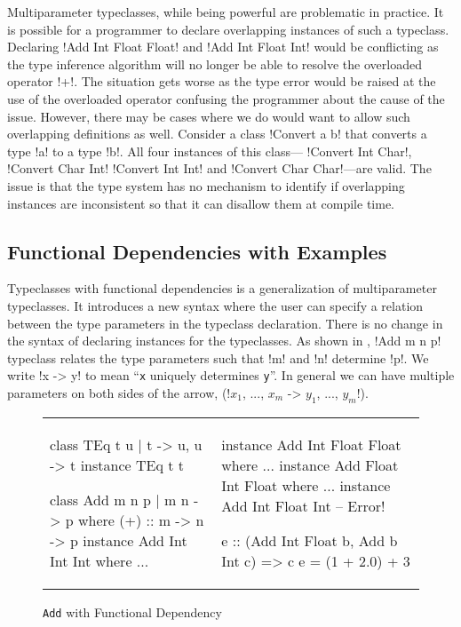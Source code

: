 \documentclass[format=acmsmall,manuscript,review,screen,nonacm,margin=1in,11pt]{acmart}
\begin{document}
Multiparameter typeclasses, while being powerful are problematic in practice.
It is possible for a programmer to declare overlapping instances of such a typeclass.
Declaring !Add Int Float Float! and !Add Int Float Int!
would be conflicting as the type inference algorithm will no longer be able to resolve
the overloaded operator !+!. The situation gets worse as the type error would be raised
at the use of the overloaded operator confusing the programmer about the
cause of the issue. However, there may be cases where we do would want to allow such overlapping definitions as well.
Consider a class !Convert a b! that converts a type !a! to a type !b!. All four instances of this class---
!Convert Int Char!, !Convert Char Int! !Convert Int Int! and !Convert Char Char!---are valid.
The issue is that the type system has no mechanism to identify if overlapping instances
are inconsistent so that it can disallow them at compile time.

\subsection{Functional Dependencies with Examples}\label{subsec:fd}
Typeclasses with functional dependencies\cite{jones_tcfd_2000} is a generalization of multiparameter typeclasses.
It introduces a new syntax where the user can specify a relation between the type parameters
in the typeclass declaration. There is no change in the syntax of declaring instances for the typeclasses.
As shown in , !Add m n p! typeclass relates the type parameters such that
!m! and !n! determine !p!. We write !x -> y! to mean ``\texttt{x} uniquely determines \texttt{y}''.
In general we can have multiple parameters on both sides of the arrow,
(!$x_1$, ..., $x_m$ -> $y_1$, ..., $y_m$!).
\begin{figure}[h t]
  \footnotesize
  \begin{tabular}{l l}
    \begin{code}
      class TEq t u | t -> u, u -> t
      instance TEq t t
      
      class Add m n p | m n -> p where
        (+) :: m -> n -> p
      instance Add Int Int Int where
         ... 
    \end{code}&%
    \begin{code}
      instance Add Int Float Float where
         ...
      instance Add Float Int Float where
         ...
      instance Add Int Float Int -- Error!

      e :: (Add Int Float b, Add b Int c) => c
      e = (1 + 2.0) + 3
    \end{code}
  \end{tabular}
  \caption{\texttt{Add} with Functional Dependency}
  \label{fig:add-tc-fd}
\end{figure}
\end{document}
